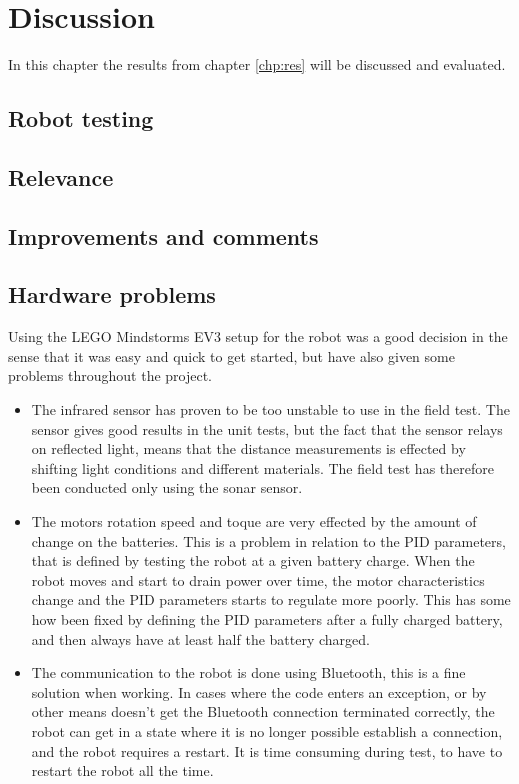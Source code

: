 \chapter{Discussion}
\label{chp:disc}
In this chapter the results from chapter \ref{chp:res} will be discussed and evaluated.

\section{Robot testing}

\section{Relevance}
\section{Improvements and comments}

\section{Hardware problems}
Using the LEGO Mindstorms EV3 setup for the robot was a good decision in the sense that it was easy and quick to get started, but have also given some problems throughout the project.

\begin{itemize}
	\item The infrared sensor has proven to be too unstable to use in the field test.
	The sensor gives good results in the unit tests, but the fact that the sensor relays on reflected light, means that the distance measurements is effected by shifting light conditions and different materials.
	The field test has therefore been conducted only using the sonar sensor.
	\item The motors rotation speed and toque are very effected by the amount of change on the batteries.
	This is a problem in relation to the PID parameters, that is defined by testing the robot at a given battery charge.
	When the robot moves and start to drain power over time, the motor characteristics change and the PID parameters starts to regulate more poorly.
	This has some how been fixed by defining the PID parameters after a fully charged battery, and then always have at least half the battery charged.
	\item The communication to the robot is done using Bluetooth, this is a fine solution when working.
	In cases where the code enters an exception, or by other means doesn't get the Bluetooth connection terminated correctly, the robot can get in a state where it is no longer possible establish a connection, and the robot requires a restart.
	It is time consuming during test, to have to restart the robot all the time.
\end{itemize}